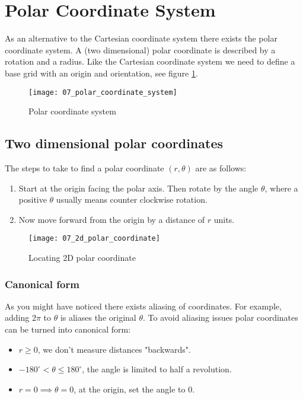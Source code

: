 \section{Polar Coordinate System}

As an alternative to the Cartesian coordinate system there exists the polar coordinate system. A (two dimensional) polar coordinate is described by a rotation and a radius. Like the Cartesian coordinate system we need to define a base grid with an origin and orientation, see figure \ref{fig:polar-coordinate-system}.

\begin{figure}[H]
\centering
    \texttt{[image: 07\_polar\_coordinate\_system]}
\caption{Polar coordinate system}
\label{fig:polar-coordinate-system}
\end{figure}

\subsection{Two dimensional polar coordinates}

The steps to take to find a polar coordinate $(r,\theta)$ are as follows: 

\begin{enumerate}
	\item Start at the origin facing the polar axis. Then rotate by the angle $\theta$, where a positive $\theta$ usually means counter clockwise rotation.
	\item Now move forward from the origin by a distance of $r$ units.
\end{enumerate}

\begin{figure}[H]
\centering
    \texttt{[image: 07\_2d\_polar\_coordinate]}
\caption{Locating 2D polar coordinate}
\label{fig:locating-2d-polar-coordinate}
\end{figure}

\subsubsection{Canonical form}

As you might have noticed there exists aliasing of coordinates. For example, adding $2\pi$ to $\theta$ is aliases the original $\theta$. To avoid aliasing issues polar coordinates can be turned into canonical form:

\begin{itemize}
	\item $r \geq 0$, we don't measure distances "backwards".
	\item $-180^\circ < \theta \leq 180^\circ$, the angle is limited to half a revolution.
	\item $r=0 \implies \theta=0$, at the origin, set the angle to $0$.
\end{itemize}

